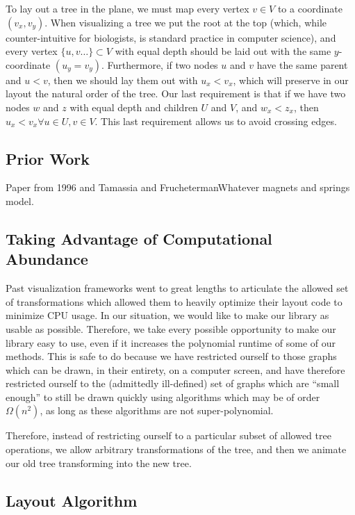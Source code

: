 \documentclass{article}
\begin{document}
To lay out a tree in the plane, we must map every vertex $v \in V$ to a
coordinate $(v_x, v_y)$.  When visualizing a tree we put the root at the top
(which, while counter-intuitive for biologists, is standard practice in
computer science), and every vertex $\{u,v \ldots\} \subset V$ with equal depth
should be laid out with the same $y$-coordinate $(u_y = v_y)$.  Furthermore, if
two nodes $u$ and $v$ have the same parent and $u < v$, then we should lay them
out with $u_x < v_x$, which will preserve in our layout the natural order of the tree.  Our last requirement is that if we have two nodes $w$ and $z$ with equal depth and children $U$ and $V$, and $w_x < z_x$, then $u_x < v_x \forall u\in U, v\in V$.  This last requirement allows us to avoid crossing edges.

\subsection{Prior Work}

Paper from 1996 and Tamassia and FruchetermanWhatever magnets and springs
model.

\subsection{Taking Advantage of Computational Abundance}

Past visualization frameworks went to great lengths to articulate the allowed
set of transformations which allowed them to heavily optimize their layout code
to minimize CPU usage.  In our situation, we would like to make our library as
usable as possible.  Therefore, we take every possible opportunity to make our
library easy to use, even if it increases the polynomial runtime of some of our
methods.  This is safe to do because we have restricted ourself to those graphs
which can be drawn, in their entirety, on a computer screen, and have therefore
restricted ourself to the (admittedly ill-defined) set of graphs which are
``small enough'' to still be drawn quickly using algorithms which may be of
order $\Omega(n^2)$, as long as these algorithms are not super-polynomial.

Therefore, instead of restricting ourself to a particular subset of allowed
tree operations, we allow arbitrary transformations of the tree, and then we
animate our old tree transforming into the new tree.

\subsection{Layout Algorithm}
\end{document}
